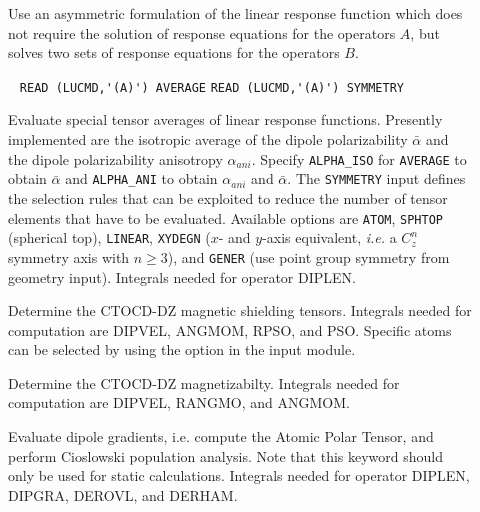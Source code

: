 \begin{description}
\item[] 
Use an asymmetric formulation of the linear response function which
does not require the solution of response equations for the operators $A$, 
but solves two sets of response equations for the operators $B$.
%
%
%
\item[] \verb| |\newline
   \verb|READ (LUCMD,'(A)') AVERAGE|\newline
   \verb|READ (LUCMD,'(A)') SYMMETRY|

Evaluate special tensor averages of linear response functions.
Presently implemented are the isotropic average of the dipole polarizability
$\bar{\alpha}$ and the dipole polarizability anisotropy $\alpha_{ani}$.
Specify \verb+ALPHA_ISO+ for \verb+AVERAGE+ to obtain $\bar{\alpha}$ and
\verb+ALPHA_ANI+ to obtain $\alpha_{ani}$ and $\bar{\alpha}$.
The \verb+SYMMETRY+ input defines the selection rules that can be
exploited to reduce the number of tensor elements that have to be
evaluated. Available options are
\verb+ATOM+, \verb+SPHTOP+ (spherical top), \verb+LINEAR+,
\verb+XYDEGN+ ($x$- and $y$-axis equivalent, {\it i.e.\/} a $C_z^n$
symmetry axis with $n \ge 3$),  and \verb+GENER+ (use point
group symmetry from geometry input).
Integrals needed for operator DIPLEN.

\item[]
Determine the CTOCD-DZ magnetic shielding tensors. Integrals 
needed for computation are DIPVEL, ANGMOM, RPSO, and PSO. Specific atoms can 
be selected by using the option  in the  input 
module.

\item[]
Determine the CTOCD-DZ magnetizabilty. Integrals needed for 
computation are DIPVEL, RANGMO, and ANGMOM.

\item[]
Evaluate dipole gradients, i.e. compute the Atomic Polar Tensor, and
perform Cioslowski population analysis. Note that this keyword should
only be used for static calculations.
Integrals needed for operator DIPLEN, DIPGRA, DEROVL, and DERHAM.
 

\end{description}
